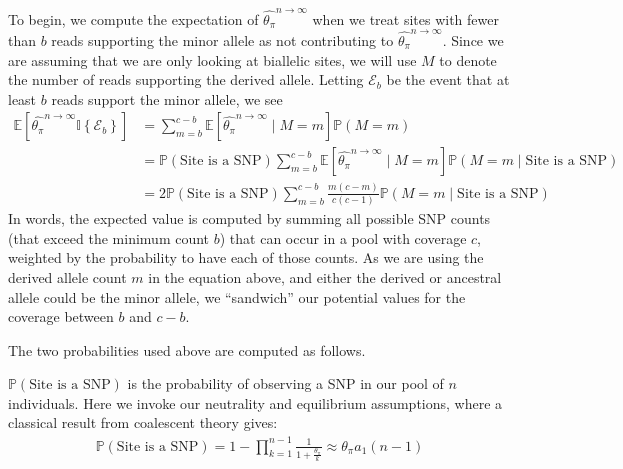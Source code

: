 \documentclass[letterpaper,fontsize=9pt,DIV=12]{scrartcl}
\newcommand{\samplesize}{n}
\newcommand{\coverage}{c}
\newcommand{\thetapi}{\widehat{\theta_\pi}}
\begin{document}
To begin, we compute the expectation of $\thetapi^{\samplesize\to\infty}$ when we treat sites with fewer than $b$ reads supporting the minor allele as not contributing to $\thetapi^{\samplesize\to\infty}$.  Since we are assuming that we are only looking at biallelic sites, we will use $M$ to denote the number of reads supporting the derived allele.  Letting $\mathcal{E}_b$ be the event that at least $b$ reads support the minor allele, we see
%
\begin{align}
\mathbb{E}\left[\thetapi^{\samplesize\to\infty} \mathbb{I}\left\{\mathcal{E}_b\right\}\right] &= \sum_{m=b}^{\coverage-b} \mathbb{E}\left[\thetapi^{\samplesize\to\infty} \mid M=m \right] \mathbb{P}(M = m)\\
&= \mathbb{P}\left(\text{Site is a SNP}\right)\sum_{m=b}^{\coverage-b} \mathbb{E}\left[\thetapi^{\samplesize\to\infty} \mid M=m \right] \mathbb{P}\left(M = m \mid \text{Site is a SNP}\right)\\
&=  2\mathbb{P}\left(\text{Site is a SNP}\right)\sum_{m=b}^{\coverage-b} \frac{m(\coverage-m)}{\coverage(\coverage-1)} \mathbb{P}\left(M = m \mid \text{Site is a SNP}\right)
\label{eq:ExpectationThetaPi}
\end{align}
%
In words, the expected value is computed by summing all possible SNP counts (that exceed the minimum count $b$) that can occur in a pool with coverage $\coverage$, weighted by the probability to have each of those counts.  As we are using the derived allele count $m$ in the equation above, and either the derived or ancestral allele could be the minor allele, we ``sandwich'' our potential values for the coverage between $b$ and $\coverage-b$.

The two probabilities used above are computed as follows.

$\mathbb{P}\left(\text{Site is a SNP}\right)$ is the probability of observing a SNP in our pool of $\samplesize$ individuals.  Here we invoke our neutrality and equilibrium assumptions, where a classical result from coalescent theory gives:
%
\begin{align}
\label{eq:PSNP}
\mathbb{P}\left(\text{Site is a SNP}\right) = 1- \prod_{k=1}^{\samplesize-1} \frac{1}{1+\frac{\theta_\pi}{k}} \approx \theta_\pi a_1(n-1)
\end{align}
\end{document}
